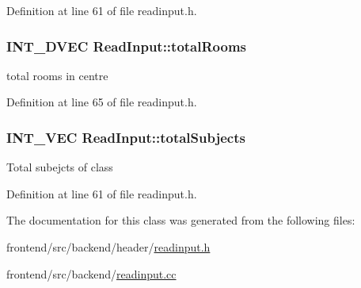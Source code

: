 Definition at line 61 of file readinput.\-h.

\hypertarget{classReadInput_a21ae2519b9f3dc9ae938fc670995822f}{
\subsubsection[{total\-Rooms}]{\setlength{\rightskip}{0pt plus 5cm}I\-N\-T\-\_\-D\-V\-E\-C Read\-Input\-::total\-Rooms\hspace{0.3cm}{\ttfamily [protected]}}}\label{classReadInput_a21ae2519b9f3dc9ae938fc670995822f}
total rooms in centre 

Definition at line 65 of file readinput.\-h.

\hypertarget{classReadInput_ad615390a3c9548b63e6081459801d3b3}{
\subsubsection[{total\-Subjects}]{\setlength{\rightskip}{0pt plus 5cm}I\-N\-T\-\_\-\-V\-E\-C Read\-Input\-::total\-Subjects\hspace{0.3cm}{\ttfamily [protected]}}}\label{classReadInput_ad615390a3c9548b63e6081459801d3b3}
Total subejcts of class 

Definition at line 61 of file readinput.\-h.



The documentation for this class was generated from the following files\-:\begin{DoxyCompactItemize}
\item 
frontend/src/backend/header/\hyperlink{readinput_8h}{readinput.\-h}\item 
frontend/src/backend/\hyperlink{readinput_8cc}{readinput.\-cc}\end{DoxyCompactItemize}
